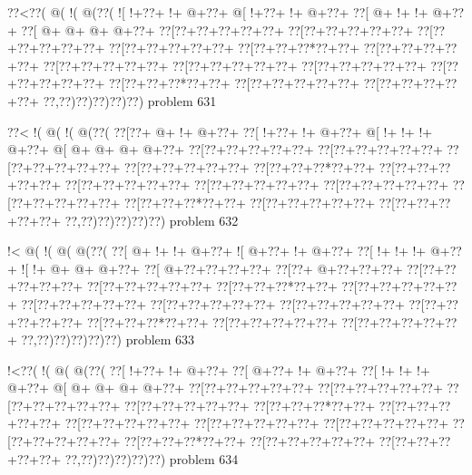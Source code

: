 \vbox{\vbox{\goo
\0??<\0??(\- @(\- !(\- @(\0??(
\- ![\- !+\0??+\- !+\- @+\0??+
\- @[\- !+\0??+\- !+\- @+\0??+
\0??[\- @+\- !+\- !+\- @+\0??+
\0??[\- @+\- @+\- @+\- @+\0??+
\0??[\0??+\0??+\0??+\0??+\0??+
\0??[\0??+\0??+\0??+\0??+\0??+
\0??[\0??+\0??+\0??+\0??+\0??+
\0??[\0??+\0??+\0??+\0??+\0??+
\0??[\0??+\0??+\0??*\0??+\0??+
\0??[\0??+\0??+\0??+\0??+\0??+
\0??[\0??+\0??+\0??+\0??+\0??+
\0??[\0??+\0??+\0??+\0??+\0??+
\0??[\0??+\0??+\0??+\0??+\0??+
\0??[\0??+\0??+\0??+\0??+\0??+
\0??[\0??+\0??+\0??*\0??+\0??+
\0??[\0??+\0??+\0??+\0??+\0??+
\0??[\0??+\0??+\0??+\0??+\0??+
\0??,\0??)\0??)\0??)\0??)\0??)
}
\hfil problem 631\hfil\break
}

\vbox{\vbox{\goo
\0??<\- !(\- @(\- !(\- @(\0??(
\0??[\0??+\- @+\- !+\- @+\0??+
\0??[\- !+\0??+\- !+\- @+\0??+
\- @[\- !+\- !+\- !+\- @+\0??+
\- @[\- @+\- @+\- @+\- @+\0??+
\0??[\0??+\0??+\0??+\0??+\0??+
\0??[\0??+\0??+\0??+\0??+\0??+
\0??[\0??+\0??+\0??+\0??+\0??+
\0??[\0??+\0??+\0??+\0??+\0??+
\0??[\0??+\0??+\0??*\0??+\0??+
\0??[\0??+\0??+\0??+\0??+\0??+
\0??[\0??+\0??+\0??+\0??+\0??+
\0??[\0??+\0??+\0??+\0??+\0??+
\0??[\0??+\0??+\0??+\0??+\0??+
\0??[\0??+\0??+\0??+\0??+\0??+
\0??[\0??+\0??+\0??*\0??+\0??+
\0??[\0??+\0??+\0??+\0??+\0??+
\0??[\0??+\0??+\0??+\0??+\0??+
\0??,\0??)\0??)\0??)\0??)\0??)
}
\hfil problem 632\hfil\break
}

\vbox{\vbox{\goo
\- !<\- @(\- !(\- @(\- @(\0??(
\0??[\- @+\- !+\- !+\- @+\0??+
\- ![\- @+\0??+\- !+\- @+\0??+
\0??[\- !+\- !+\- !+\- @+\0??+
\- ![\- !+\- @+\- @+\- @+\0??+
\0??[\- @+\0??+\0??+\0??+\0??+
\0??[\0??+\- @+\0??+\0??+\0??+
\0??[\0??+\0??+\0??+\0??+\0??+
\0??[\0??+\0??+\0??+\0??+\0??+
\0??[\0??+\0??+\0??*\0??+\0??+
\0??[\0??+\0??+\0??+\0??+\0??+
\0??[\0??+\0??+\0??+\0??+\0??+
\0??[\0??+\0??+\0??+\0??+\0??+
\0??[\0??+\0??+\0??+\0??+\0??+
\0??[\0??+\0??+\0??+\0??+\0??+
\0??[\0??+\0??+\0??*\0??+\0??+
\0??[\0??+\0??+\0??+\0??+\0??+
\0??[\0??+\0??+\0??+\0??+\0??+
\0??,\0??)\0??)\0??)\0??)\0??)
}
\hfil problem 633\hfil\break
}

\vbox{\vbox{\goo
\- !<\0??(\- !(\- @(\- @(\0??(
\0??[\- !+\0??+\- !+\- @+\0??+
\0??[\- @+\0??+\- !+\- @+\0??+
\0??[\- !+\- !+\- !+\- @+\0??+
\- @[\- @+\- @+\- @+\- @+\0??+
\0??[\0??+\0??+\0??+\0??+\0??+
\0??[\0??+\0??+\0??+\0??+\0??+
\0??[\0??+\0??+\0??+\0??+\0??+
\0??[\0??+\0??+\0??+\0??+\0??+
\0??[\0??+\0??+\0??*\0??+\0??+
\0??[\0??+\0??+\0??+\0??+\0??+
\0??[\0??+\0??+\0??+\0??+\0??+
\0??[\0??+\0??+\0??+\0??+\0??+
\0??[\0??+\0??+\0??+\0??+\0??+
\0??[\0??+\0??+\0??+\0??+\0??+
\0??[\0??+\0??+\0??*\0??+\0??+
\0??[\0??+\0??+\0??+\0??+\0??+
\0??[\0??+\0??+\0??+\0??+\0??+
\0??,\0??)\0??)\0??)\0??)\0??)
}
\hfil problem 634\hfil\break
}

